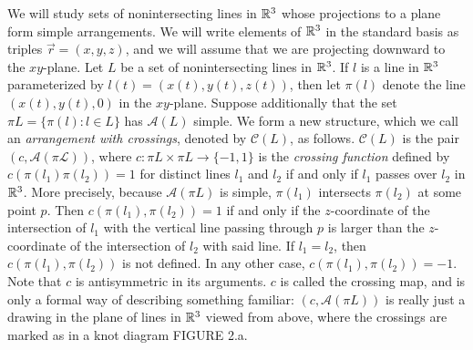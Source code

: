 \documentclass[11pt, oneside]{article}
\begin{document}
We will study sets of nonintersecting lines in $\mathbb{R}^3$ whose projections to a plane form simple arrangements. We will write elements of $\mathbb{R}^3$ in the standard basis as triples $\vec{r} = (x, y, z)$, and we will assume that we are projecting downward to the $xy$-plane. Let $L$ be a set of nonintersecting lines in $\mathbb{R}^3$. If $l$ is a line in $\mathbb{R}^3$ parameterized by $l(t) = (x(t), y(t), z(t))$, then let $\pi(l)$ denote the line $(x(t), y(t), 0)$ in the $xy$-plane. Suppose additionally that the set $\pi L = \{\pi(l): l \in L\}$ has $\mathcal{A}(L)$ simple. We form a new structure, which we call an \emph{arrangement with crossings}, denoted by $\mathcal{C}(L)$, as follows. 
$\mathcal{C}(L)$ is the pair $(c, \mathcal{A(\pi L)})$, where $c: \pi L \times \pi L \to \{-1, 1\}$ is the \emph{crossing function} defined by $c(\pi(l_1) \pi(l_2)) = 1$ for distinct lines $l_1$ and $l_2$ if and only if $l_1$ passes over $l_2$ in $\mathbb{R}^3$. More precisely, because $\mathcal{A}(\pi L)$ is simple, $\pi(l_1)$ intersects $\pi(l_2)$ at some point $p$. Then $c(\pi(l_1), \pi(l_2)) = 1$ if and only if the $z$-coordinate of the intersection of $l_1$ with the vertical line passing through $p$ is larger than the $z$-coordinate of the intersection of $l_2$ with said line. If $l_1 = l_2$, then $c(\pi(l_1), \pi(l_2))$ is not defined. In any other case, $c(\pi(l_1), \pi(l_2)) = -1$. Note that $c$ is antisymmetric in its arguments. $c$ is called the crossing map, and is only a formal way of describing something familiar: $(c, \mathcal{A}(\pi L))$ is really just a drawing in the plane of lines in $\mathbb{R}^3$ viewed from above, where the crossings are marked as in a knot diagram FIGURE 2.a. \\
\end{document}
